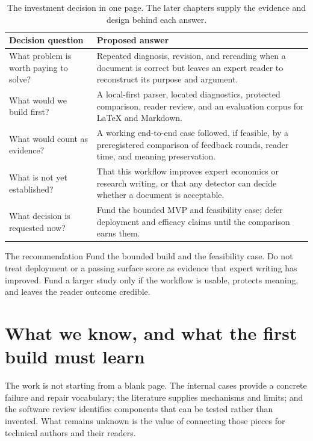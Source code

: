 \begin{table}[H]
\centering
\small
\begin{tabular}{@{}p{}p{}@{}}
\toprule
Decision question & Proposed answer \\
\midrule
What problem is worth paying to solve? & Repeated diagnosis, revision, and rereading when a document is correct but leaves an expert reader to reconstruct its purpose and argument. \\
What would we build first? & A local-first parser, located diagnostics, protected comparison, reader review, and an evaluation corpus for LaTeX and Markdown. \\
What would count as evidence? & A working end-to-end case followed, if feasible, by a preregistered comparison of feedback rounds, reader time, and meaning preservation. \\
What is not yet established? & That this workflow improves expert economics or research writing, or that any detector can decide whether a document is acceptable. \\
What decision is requested now? & Fund the bounded MVP and feasibility case; defer deployment and efficacy claims until the comparison earns them. \\
\bottomrule
\end{tabular}
\caption{The investment decision in one page. The later chapters supply the evidence and design behind each answer.}
\label{tab:opening-decision}
\end{table}

\Needspace{4.5cm}
\begin{decisionbox}{The recommendation}
Fund the bounded build and the feasibility case. Do not treat deployment or a
passing surface score as evidence that expert writing has improved. Fund a
larger study only if the workflow is usable, protects meaning, and leaves the
reader outcome credible.
\end{decisionbox}

\section{What we know, and what the first build must learn}

The work is not starting from a blank page. The internal cases provide a
concrete failure and repair vocabulary; the literature supplies mechanisms and
limits; and the software review identifies components that can be tested rather
than invented. What remains unknown is the value of connecting those pieces for
technical authors and their readers.


